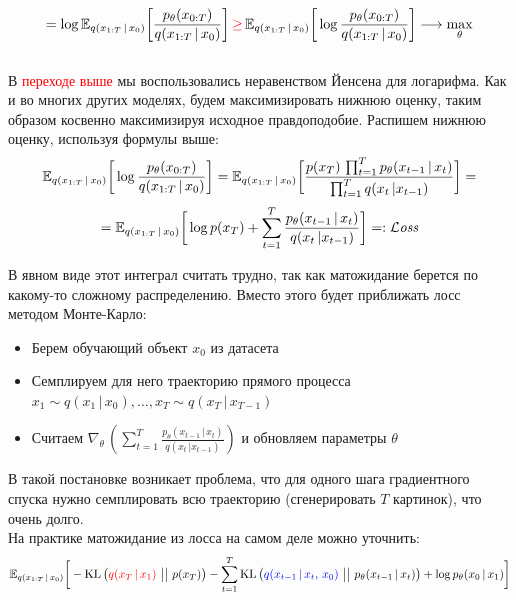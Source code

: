 \documentclass[12pt]{article}
\theoremstyle{definition} %
\theoremstyle{plain} %
\theoremstyle{remark} %
\begin{document}
        \[
        = \log \mathbb{E}_{\textcolor{black}{q(x_{1:T} \, | \, x_0)}} \bigg[\frac{p_\theta(x_{0:T})}{\textcolor{black}{q(x_{1:T} \, | \, x_0)}}\bigg] \,\textcolor{red}{\geq} \, \mathbb{E}_{\textcolor{black}{q(x_{1:T} \, | \, x_0)}} \bigg[\log \frac{p_\theta(x_{0:T})}{\textcolor{black}{q(x_{1:T} \, | \, x_0)}}\bigg] \longrightarrow \max_{\theta}
        \]\\
        
        В \textcolor{red}{переходе выше} мы воспользовались неравенством Йенсена для логарифма. Как и во многих других моделях, будем максимизировать нижнюю оценку, таким образом косвенно максимизируя исходное правдоподобие. Распишем нижнюю оценку, используя формулы выше:
        \[
        \mathbb{E}_{\textcolor{black}{q(x_{1:T} \, | \, x_0)}} \bigg[\log \frac{p_\theta(x_{0:T})}{\textcolor{black}{q(x_{1:T} \, | \, x_0)}}\bigg] = \mathbb{E}_{q(x_{1:T} \, | \, x_0)} \bigg[ \frac{p(x_T) \,\prod_{t=1}^Tp_\theta(x_{t-1} \, | \, x_t)}{\prod_{t=1}^T q(x_t \, | x_{t-1})}\bigg] =
        \]
        \[
        = \mathbb{E}_{\textcolor{black}{q(x_{1:T} \, | \, x_0)}} \bigg[\log p(x_T) + \sum_{t=1}^T\frac{p_\theta(x_{t-1} \, | \, x_t)}{q(x_t \, | x_{t-1})} \bigg] =: \mathcal{L}\textit{oss}
        \]

        \pagebreak

        В явном виде этот интеграл считать трудно, так как матожидание берется по какому-то сложному распределению. Вместо этого будет приближать лосс методом Монте-Карло:

        \begin{itemize}
            \item Берем обучающий объект $x_0$ из датасета
            \item Семплируем для него траекторию прямого процесса $x_1 \sim q(x_1 \, | \, x_0), \dots, x_T \sim q(x_T \, | \, x_{T-1})$
            \item Считаем $\nabla_\theta \, \left(\sum_{t=1}^T\frac{p_\theta(x_{t-1} \, | \, x_t)}{q(x_t \, | x_{t-1})}\right)$ и обновляем параметры $\theta$
        \end{itemize}

        В такой постановке возникает проблема, что для одного шага градиентного спуска нужно семплировать всю траекторию (сгенерировать $T$ картинок), что очень долго. \\

        На практике матожидание из лосса на самом деле можно уточнить:
        \[
        \mathbb{E}_{q(x_{1:T} \, | \, x_0)}\bigg[ -\text{KL}\left(\textcolor{red}{q(x_T \, | \, x_1)}\,\, \big|\big| \,\, p(x_T)\right) - \sum_{t=1}^T\text{KL}\left(\textcolor{blue}{q(x_{t-1} \, | \, x_t,\, x_0)}\,\, \big|\big| \,\, p_\theta(x_{t-1} \, | \, x_t)\right) + \log p_\theta(x_0 \, | \, x_1) \bigg]
        \]
\end{document}
